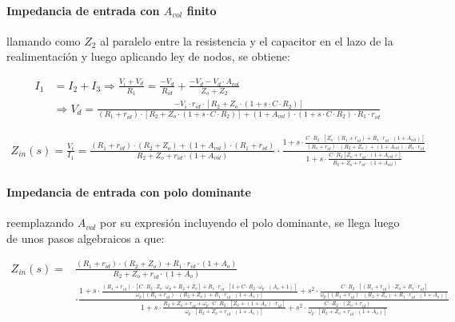 \paragraph*{Impedancia de entrada con $A_{vol}$ finito} llamando como $Z_2$ al paralelo entre la resistencia y el capacitor en el lazo de la realimentaci\'on y luego aplicando ley de nodos, se obtiene:

\begin{align*}
	I_1 & = I_2 + I_3 \Rightarrow \frac{V_i + V_d}{R_1} = \frac{-V_d}{R_{id}} + \frac{-V_d - V_d \cdot A_{vol}}{Z_o + Z_2}\\
	& \Rightarrow
	V_d = \frac{- V_i \cdot r_{id} \cdot \left[ R_2 + Z_o \cdot (1 + s \cdot C \cdot R_2) \right]}{(R_1 + r_{id}) \cdot \left[R_2 + Z_o \cdot (1 + s \cdot C \cdot R_2) \right] + (1 + A_{vol}) \cdot ( 1 + s \cdot C \cdot R_2) \cdot R_1 \cdot r_{id}}
\end{align*}

\begin{align}
	Z_{in}(s) = \frac{V_i}{I_1} = \frac{(R_1 + r_{id}) \cdot (R_2 + Z_o) + (1 + A_{vol}) \cdot (R_1 + r_{id})}{R_2 + Z_o + r_{id} \cdot(1 + A_{vol})} \cdot \frac{1 + s \cdot \frac{C \cdot R_2 \cdot \left[ Z_o \cdot (R_1 + r_{id}) + R_1 \cdot r_{id} \cdot ( 1 + A_{vol}) \right]}{(R_1 + r_{id}) \cdot (R_2 + Z_o) + (1 + A_{vol}) \cdot R_1 \cdot r_{id}}}{1 + s \cdot \frac{C \cdot R_2 \left[ Z_o + r_{id} \cdot ( 1 + A_{vol}) \right]}{R_2 + Z_o + r_{id} \cdot ( 1 + A_{vol})}}
\end{align}

\paragraph*{Impedancia de entrada con polo dominante} reemplazando $A_{vol}$ por su expresi\'on incluyendo el polo dominante, se llega luego de unos pasos algebraicos a que:

\begin{align}
	Z_{in}(s) = & \frac{(R_1+r_{id})\cdot(R_2 + Z_o) + R_1 \cdot r_{id} \cdot(1+A_o)}{R_2 + Z_o + r_{id} \cdot(1 + A_o)} \\
	& \cdot \frac{1 + s \cdot \frac{(R_1 + r_{id}) \cdot \left[C \cdot R_2 \cdot Z_o \cdot \omega_p + R_2 + Z_o \right] + R_1 \cdot r_{id} \cdot \left[ 1 + C \cdot R_2 \cdot \omega_p \cdot (A_o + 1) \right] }{\omega_p \left[ (R_1 + r_{id}) \cdot (R_2 + Z_o) + R_1 \cdot r_{id} \cdot(1 + A_o) \right] } + s^{2} \cdot \frac{C \cdot R_2 \cdot \left[ (R_1 + r_{id}) \cdot Z_o + R_1 \cdot r_{id} \right] }{\omega_p \left[ (R_1 + r_{id}) \cdot (R_2 + Z_o) + R_1 \cdot r_{id} \cdot(1 + A_o) \right]}}{1 + s \cdot \frac{R_2 + Z_o + r_{id} + \omega_p \cdot C \cdot R_2 \cdot \left[ Z_o + (1 + A_o) \cdot r_{id} \right] }{\omega_p \cdot \left[ R_2 + Z_o + r_{id} \cdot(1 + A_o) \right] } + s^{2} \cdot \frac{C \cdot R_2 \cdot (Z_o + r_{id})}{\omega_p \cdot \left[ R_2 + Z_o + r_{id} \cdot(1 + A_o) \right] }}
\end{align}


